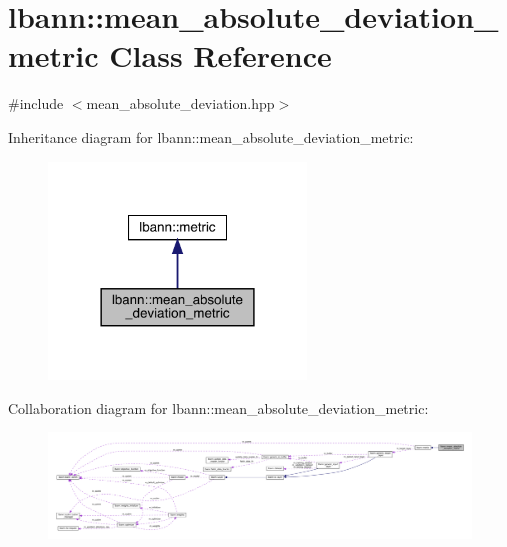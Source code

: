 \hypertarget{classlbann_1_1mean__absolute__deviation__metric}{}\section{lbann\+:\+:mean\+\_\+absolute\+\_\+deviation\+\_\+metric Class Reference}
\label{classlbann_1_1mean__absolute__deviation__metric}


{\ttfamily \#include $<$mean\+\_\+absolute\+\_\+deviation.\+hpp$>$}



Inheritance diagram for lbann\+:\+:mean\+\_\+absolute\+\_\+deviation\+\_\+metric\+:\nopagebreak
\begin{figure}[H]
\begin{center}
\leavevmode
\includegraphics[width=194pt]{classlbann_1_1mean__absolute__deviation__metric__inherit__graph}
\end{center}
\end{figure}


Collaboration diagram for lbann\+:\+:mean\+\_\+absolute\+\_\+deviation\+\_\+metric\+:\nopagebreak
\begin{figure}[H]
\begin{center}
\leavevmode
\includegraphics[width=350pt]{classlbann_1_1mean__absolute__deviation__metric__coll__graph}
\end{center}
\end{figure}
